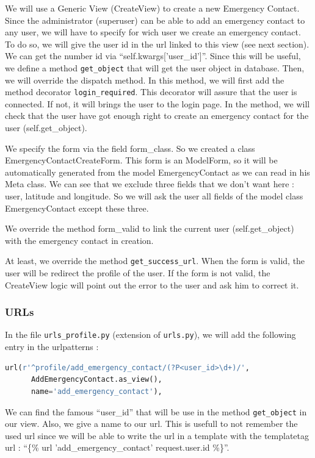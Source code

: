 \documentclass[11pt, a4paper]{article}   	%
\begin{document}
We will use a Generic View (CreateView) to create a new Emergency Contact. Since the administrator (superuser) can be able to add an emergency contact to any user, we will have to specify for wich user we create an emergency contact. To do so, we will give the user id in the url linked to this view (see next section). We can get the number id via ``self.kwargs['user\_id']''. Since this will be useful, we define a method \texttt{get\_object} that will get the user object in database. Then, we will override the dispatch method. In this method, we will first add the method decorator \texttt{login\_required}. This decorator will assure that the user is connected. If not, it will brings the user to the login page. In the method, we will check that the user have got enough right to create an emergency contact for the user (self.get\_object). 

We specify the form via the field form\_class. So we created a class EmergencyContactCreateForm. This form is an ModelForm, so it will be automatically generated from the model EmergencyContact as we can read in his Meta class. We can see that we exclude three fields that we don't want here : user, latitude and longitude. So we will ask the user all fields of the model class EmergencyContact except these three.

We override the method form\_valid to link the current user (self.get\_object) with the emergency contact in creation.

At least, we override the method \texttt{get\_success\_url}. When the form is valid, the user will be redirect the profile of the user. If the form is not valid, the CreateView logic will point out the error to the user and ask him to correct it.

\subsubsection{URLs}

In the file \texttt{urls\_profile.py} (extension of \texttt{urls.py}), we will add the following entry in the urlpatterns :

\begin{lstlisting}[language=Python, basicstyle=\footnotesize]
  url(r'^profile/add_emergency_contact/(?P<user_id>\d+)/',
      AddEmergencyContact.as_view(),
      name='add_emergency_contact'), 
\end{lstlisting}

We can find the famous ``user\_id'' that will be use in the method \texttt{get\_object} in our view. Also, we give a name to our url. This is usefull to not remember the used url since we will be able to write the url in a template with the templatetag url : ``\{\% url 'add\_emergency\_contact' request.user.id \%\}''.
\end{document}
